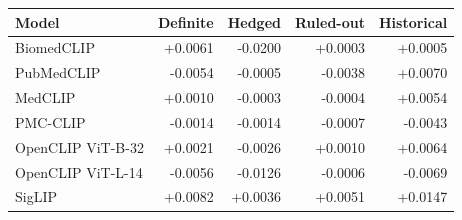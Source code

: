 \begin{tabular}{lrrrr}
\toprule
Model & Definite & Hedged & Ruled-out & Historical \\
\midrule
BiomedCLIP & +0.0061 & -0.0200 & +0.0003 & +0.0005 \\
PubMedCLIP & -0.0054 & -0.0005 & -0.0038 & +0.0070 \\
MedCLIP & +0.0010 & -0.0003 & -0.0004 & +0.0054 \\
PMC-CLIP & -0.0014 & -0.0014 & -0.0007 & -0.0043 \\
OpenCLIP ViT-B-32 & +0.0021 & -0.0026 & +0.0010 & +0.0064 \\
OpenCLIP ViT-L-14 & -0.0056 & -0.0126 & -0.0006 & -0.0069 \\
SigLIP & +0.0082 & +0.0036 & +0.0051 & +0.0147 \\
\bottomrule
\end{tabular}
